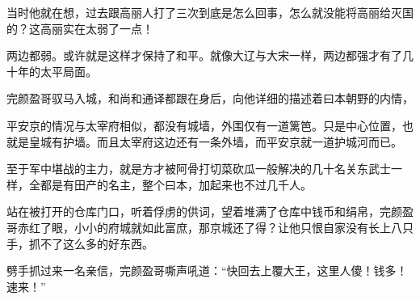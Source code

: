 当时他就在想，过去跟高丽人打了三次到底是怎么回事，怎么就没能将高丽给灭国的？这高丽实在太弱了一点！

两边都弱。或许就是这样才保持了和平。就像大辽与大宋一样，两边都强才有了几十年的太平局面。

完颜盈哥驭马入城，和尚和通译都跟在身后，向他详细的描述着曰本朝野的内情，

平安京的情况与太宰府相似，都没有城墙，外围仅有一道篱笆。只是中心位置，也就是皇城有护墙。而且太宰府这边还有一条外墙，而平安京就一道护城河而已。

至于军中堪战的主力，就是方才被阿骨打切菜砍瓜一般解决的几十名关东武士一样，全都是有田产的名主，整个曰本，加起来也不过几千人。

站在被打开的仓库门口，听着俘虏的供词，望着堆满了仓库中钱币和绢帛，完颜盈哥赤红了眼，小小的府城就如此富庶，那京城还了得？让他只恨自家没有长上八只手，抓不了这么多的好东西。

劈手抓过来一名亲信，完颜盈哥嘶声吼道：“快回去上覆大王，这里人傻！钱多！速来！”
